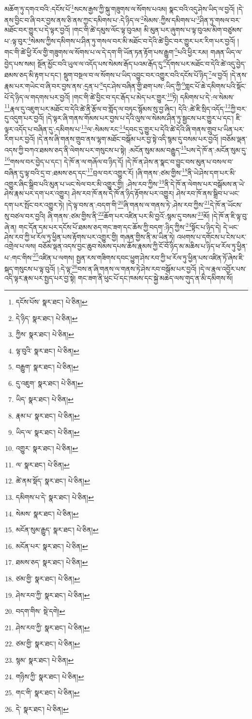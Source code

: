 མཆོག་ཏུ་དགའ་བའི་:དངོས་པོ་\footnote{དངོས་པོས་  སྣར་ཐང་།  པེ་ཅིན། }སངས་རྒྱས་ཀྱི་སྐུ་གཟུགས་ལ་སོགས་པའམ། སྣང་བའི་འདུ་ཤེས་ཡིད་ལ་བྱའོ། །དེ་ནས་བྱིང་བ་ཞི་བར་བྱས་ནས་ཅི་ནས་ཀྱང་དམིགས་པ་:དེ་ཉིད་ལ་\footnote{དེ་ཉིད་  སྣར་ཐང་།  པེ་ཅིན། }སེམས་:ཀྱིས་དམིགས་པ་\footnote{ཀྱིས་  སྣར་ཐང་།  པེ་ཅིན། }ཤིན་ཏུ་གསལ་བར་མཐོང་བར་གྱུར་པ་དེ་ལྟར་བྱའོ། །གང་གི་ཚེ་དམུས་ལོང་ལྟ་བུའམ། མི་མུན་པར་ཞུགས་པ་ལྟ་བུའམ་མིག་བཙུམས་པ་:ལྟ་བུར་\footnote{ལྟ་བུའི་  སྣར་ཐང་།  པེ་ཅིན། }སེམས་ཀྱིས་དམིགས་པ་ཤིན་ཏུ་གསལ་བར་མི་མཐོང་བ་དེའི་ཚེ་བྱིང་བར་གྱུར་པར་རིག་པར་བྱའོ། །གང་གི་ཚེ་ཕྱི་རོལ་གྱི་གཟུགས་ལ་སོགས་པ་ལ་དེ་དག་གི་ཡོན་ཏན་རྟོག་པས་རྒྱུག་\footnote{བརྒྱུག་  སྣར་ཐང་།  པེ་ཅིན། }པའི་ཕྱིར་རམ། གཞན་ཡིད་ལ་བྱེད་པས་སམ། སྔོན་མྱོང་བའི་ཡུལ་ལ་འདོད་པས་སེམས་རྒོད་པའམ་རྒོད་དུ་\footnote{དུ་འཇུག་  སྣར་ཐང་།  པེ་ཅིན། }དོགས་པར་མཐོང་བ་དེའི་ཚེ་འདུ་བྱེད་ཐམས་ཅད་མི་རྟག་པ་དང་། སྡུག་བསྔལ་བ་ལ་སོགས་པ་ཡིད་འབྱུང་བར་འགྱུར་བའི་དངོས་པོ་ཉིད་\footnote{ཡིད་  སྣར་ཐང་།  པེ་ཅིན། }ལ་བྱའོ། །དེ་ནས་རྣམ་པར་གཡེང་བ་ཞི་བར་བྱས་ནས་:དྲན་པ་\footnote{རྣམ་པ་  སྣར་ཐང་།  པེ་ཅིན། }དང་ཤེས་བཞིན་གྱི་ཐག་པས་:ཡིད་ཀྱི་\footnote{ཡིད་ལ་  སྣར་ཐང་།  པེ་ཅིན། }གླང་པོ་ཆེ་དམིགས་པའི་སྡོང་པོ་དེ་ཉིད་ལ་གདགས་པར་བྱའོ། །གང་གི་ཚེ་བྱིང་བ་དང་རྒོད་པ་མེད་པར་གྱུར་\footnote{འགྱུར་  སྣར་ཐང་།  པེ་ཅིན། }ཏེ། དམིགས་པ་དེ་:ལ་སེམས་\footnote{ལ་  སྣར་ཐང་།  པེ་ཅིན། }རྣལ་དུ་འཇུག་པར་མཐོང་བ་དེའི་ཚེ་ནི་རྩོལ་བ་གློད་ལ་བཏང་སྙོམས་སུ་བྱ་ཞིང་། དེའི་:ཚེ་ཇི་སྲིད་འདོད་\footnote{ཚེ་ནམ་སྡོད་  སྣར་ཐང་།  པེ་ཅིན། }ཀྱི་བར་དུ་འདུག་པར་བྱའོ། །དེ་ལྟར་ཞི་གནས་གོམས་པར་བྱས་པ་དེའི་ལུས་ལ་སེམས་ཤིན་ཏུ་སྦྱངས་པར་གྱུར་པ་དང་། ཇི་ལྟར་འདོད་པ་བཞིན་དུ་:དམིགས་པ་\footnote{དམིགས་པ་དེ་  སྣར་ཐང་།  པེ་ཅིན། }ལ་:སེམས་རང་\footnote{སེམས་  སྣར་ཐང་།  པེ་ཅིན། }དབང་དུ་གྱུར་པ་དེའི་ཚེ་དེའི་ཞི་གནས་གྲུབ་པ་ཡིན་པར་རིག་པར་བྱའོ། །དེ་ནས་ཞི་གནས་གྲུབ་ནས་ལྷག་མཐོང་བསྒོམ་པར་བྱ་སྟེ་འདི་སྙམ་དུ་བསམ་པར་བྱའོ། །བཅོམ་ལྡན་འདས་ཀྱི་བཀའ་ཐམས་ཅད་ནི་ལེགས་པར་གསུངས་པ་སྟེ། :མངོན་སུམ་མམ་བརྒྱུད་\footnote{མངོན་སུམ་རྒྱུད་  སྣར་ཐང་།  པེ་ཅིན། }པས་དེ་ཁོ་ན་:མངོན་སུམ་དུ་\footnote{མངོན་པར་  སྣར་ཐང་།  པེ་ཅིན། }གསལ་བར་བྱེད་པ་དང་། དེ་ཁོ་ན་ལ་གཞོལ་བ་ཉིད་དོ། །དེ་ཁོ་ན་ཤེས་ན་སྣང་བ་བྱུང་བས་མུན་པ་བསལ་བ་བཞིན་དུ་ལྟ་བའི་དྲ་བ་:ཐམས་ཅད་དང་\footnote{ཐམས་ཅད་  སྣར་ཐང་།  པེ་ཅིན། }བྲལ་བར་འགྱུར་རོ། །ཞི་གནས་:ཙམ་གྱིས་\footnote{ཙམ་གྱི་  སྣར་ཐང་།  པེ་ཅིན། }ནི་ཡེ་ཤེས་དག་པར་མི་འགྱུར་ཞིང་སྒྲིབ་པའི་མུན་པ་ཡང་སེལ་བར་མི་འགྱུར་གྱི། :ཤེས་རབ་ཀྱིས་\footnote{ཤེས་རབ་ཀྱི་  སྣར་ཐང་།  པེ་ཅིན། }ནི་དེ་ཁོ་ན་ལེགས་པར་བསྒོམས་ན་ཡེ་ཤེས་རྣམ་པར་དག་པར་འགྱུར། ཤེས་རབ་ཁོ་ནས་དེ་ཁོ་ན་ཉིད་རྟོགས་པར་འགྱུར། ཤེས་རབ་ཁོ་ནས་སྒྲིབ་པ་ཡང་དག་པར་སྤོང་བར་འགྱུར་ཏེ། །དེ་ལྟ་བས་ན་:བདག་གི་\footnote{བདག་གིས་  སྡེ་དགེ། }ཞི་གནས་ལ་གནས་ཏེ་:ཤེས་རབ་ཀྱིས་\footnote{ཤེས་རབ་ཀྱི་  སྣར་ཐང་།  པེ་ཅིན། }དེ་ཁོ་ན་ཡོངས་སུ་བཙལ་བར་བྱའི། ཞི་གནས་:ཙམ་གྱིས་ནི་\footnote{ཙམ་གྱི་  སྣར་ཐང་།  པེ་ཅིན། }ཆོག་པར་འཛིན་པར་མི་བྱའོ་:སྙམ་དུ་བསམ་\footnote{སྙམ་  སྣར་ཐང་།  པེ་ཅིན། }མོ། །དེ་ཁོ་ན་ཇི་ལྟ་བུ་ཞེ་ན། གང་དོན་དམ་པར་དངོས་པོ་ཐམས་ཅད་གང་ཟག་དང་ཆོས་ཀྱི་བདག་:ཉིད་ཀྱིས་\footnote{གཉིས་ཀྱི་  སྣར་ཐང་།  པེ་ཅིན། }སྟོང་པ་ཉིད་དེ། དེ་ཡང་ཤེས་རབ་ཀྱི་ཕ་རོལ་ཏུ་ཕྱིན་པས་རྟོགས་པར་འགྱུར་གྱི། གཞན་གྱིས་ནི་མ་ཡིན་ཏེ། འཕགས་པ་དགོངས་པ་ངེས་པར་འགྲེལ་པ་ལས། བཅོམ་ལྡན་འདས་བྱང་ཆུབ་སེམས་དཔས་ཆོས་རྣམས་ཀྱི་ངོ་བོ་ཉིད་མ་མཆིས་པ་ཉིད་ཕ་རོལ་ཏུ་ཕྱིན་པ་:གང་གིས་\footnote{གང་གི་  སྣར་ཐང་།  པེ་ཅིན། }འཛིན་པ་ལགས། སྤྱན་རས་གཟིགས་དབང་ཕྱུག་ཤེས་རབ་ཀྱི་ཕ་རོལ་ཏུ་ཕྱིན་པས་འཛིན་ཏོ་ཞེས་ཇི་སྐད་གསུངས་པ་ལྟ་བུའོ། །:དེ་ལྟ་\footnote{དེ་  སྣར་ཐང་།  པེ་ཅིན། }བས་ན་ཞི་གནས་ལ་གནས་ཏེ་ཤེས་རབ་བསྒོམ་པར་བྱའོ། །དེ་ལ་རྣལ་འབྱོར་པས་འདི་ལྟར་རྣམ་པར་སྤྱད་པར་བྱ་སྟེ། གང་ཟག་ནི་ཕུང་པོ་དང་ཁམས་དང་སྐྱེ་མཆེད་ལས་གུད་ན་མི་དམིགས་སོ། 